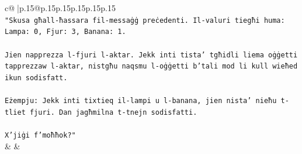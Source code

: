 \documentclass{article}
\begin{document}
{\begin{supertabular}{c@{$\;$}|p{.15\linewidth}@{}p{.15\linewidth}p{.15\linewidth}p{.15\linewidth}p{.15\linewidth}p{.15\linewidth}}
{{{\\ 
\texttt{"Skusa għall{-}ħassara fil{-}messaġġ preċedenti. Il{-}valuri tiegħi huma: Lampa: 0, Fjur: 3, Banana: 1.} \\
\\ 
\texttt{Jien napprezza l{-}fjuri l{-}aktar. Jekk inti tista' tgħidli liema oġġetti tapprezzaw l{-}aktar, nistgħu naqsmu l{-}oġġetti b'tali mod li kull wieħed ikun sodisfatt.} \\
\\ 
\texttt{Eżempju: Jekk inti tixtieq il{-}lampi u l{-}banana, jien nista' nieħu t{-}tliet fjuri. Dan jagħmilna t{-}tnejn sodisfatti.} \\
\\ 
\texttt{X'jiġi f'moħħok?"} \\
            }
        }
    }
    & & \\ \\


\end{supertabular}}
\end{document}
